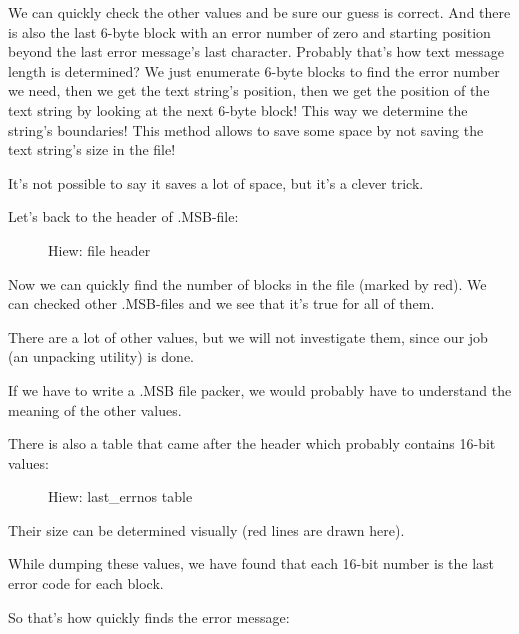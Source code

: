 We can quickly check the other values and be sure our guess is correct.
And there is also the last  6-byte block 
with an error number of zero and starting position beyond the last error message's last character.
Probably that's how text message length is 
determined?
We just enumerate 6-byte blocks to find the error number
we need, then we get the text string's position, then we get the position of the text string by looking at the next
6-byte block!
This way we determine the string's boundaries!
This method allows to 
save some space by not saving the text string's size in the file!

It's not possible to say it saves a lot of space, but it's a clever trick.

\clearpage
Let's back to the header of .MSB-file:

\begin{figure}[H]
\centering
{}
\caption{Hiew: file header}
\label{fig:oracle_MSB_3}
\end{figure}

Now we can quickly find the number of blocks in the file (marked by red).
We can checked other .MSB-files and we see that it's true for all of them.

There are a lot of other values, but we will not investigate them, since our job (an unpacking utility) is done.

If we have to write a .MSB file packer, we would probably have to understand the meaning of the other values.

\clearpage
There is also a table that came after the header which probably contains 16-bit values:

\begin{figure}[H]
\centering
{}
\caption{Hiew: last\_errnos table}
\label{fig:oracle_MSB_4}
\end{figure}

Their size can be determined visually (red lines are drawn here).

While dumping these values, we have found that each 16-bit number is the last error code for each block.

So that's how \oracle quickly finds the error message:

